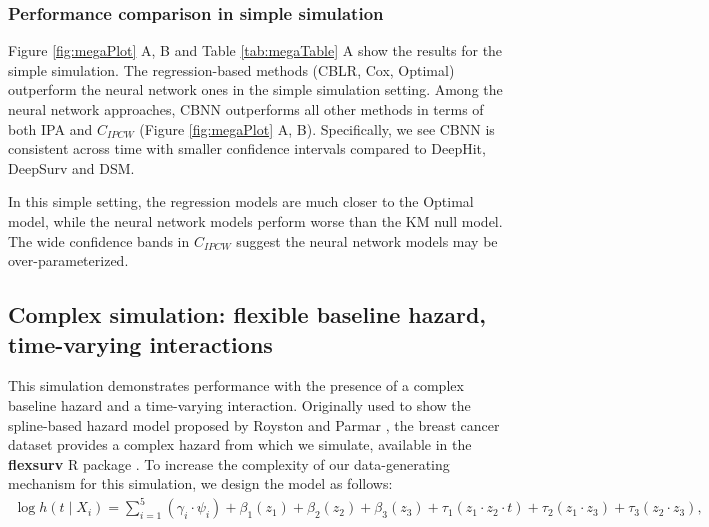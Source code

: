 \documentclass[APA,LATO1COL]{WileyNJD-v2}
\begin{document}
\hypertarget{performance-comparison-in-simple-simulation}{%
\subsubsection{Performance comparison in simple
simulation}\label{performance-comparison-in-simple-simulation}}

Figure \ref{fig:megaPlot} A, B and Table \ref{tab:megaTable} A show the
results for the simple simulation. The regression-based methods (CBLR,
Cox, Optimal) outperform the neural network ones in the simple
simulation setting. Among the neural network approaches, CBNN
outperforms all other methods in terms of both IPA and \(C_{IPCW}\)
(Figure \ref{fig:megaPlot} A, B). Specifically, we see CBNN is
consistent across time with smaller confidence intervals compared to
DeepHit, DeepSurv and DSM.

In this simple setting, the regression models are much closer to the
Optimal model, while the neural network models perform worse than the KM
null model. The wide confidence bands in \(C_{IPCW}\) suggest the neural
network models may be over-parameterized.

\hypertarget{complex-simulation-flexible-baseline-hazard-time-varying-interactions}{%
\subsection{Complex simulation: flexible baseline hazard, time-varying
interactions}\label{complex-simulation-flexible-baseline-hazard-time-varying-interactions}}

This simulation demonstrates performance with the presence of a complex
baseline hazard and a time-varying interaction. Originally used to show
the spline-based hazard model proposed by Royston and Parmar
\citep{royston2002flexible}, the breast cancer dataset provides a
complex hazard from which we simulate, available in the
\textbf{flexsurv} R package \citep{flexsurv}. To increase the complexity
of our data-generating mechanism for this simulation, we design the
model as follows: \begin{align}
\log h(t \mid X_i) =\sum_{i=1}^{5} (\gamma_{i} \cdot \psi_{i}) + \beta_{{1}} (z_{1}) + \beta_{{2}} (z_{2})+ \beta_{{3}} (z_{3})+ \tau_{1} ( z_{1} \cdot z_{2} \cdot t)+ \tau_{2} ( z_{1} \cdot z_{3})+ \tau_{3} (z_{2} \cdot z_{3}), \nonumber
\end{align}
\end{document}
